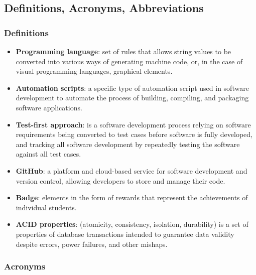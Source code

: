 \newpage

\subsection{Definitions, Acronyms, Abbreviations}

\subsubsection{Definitions}

\begin{itemize}
    \item \textbf{Programming language}: set of rules that allows string values to be converted into various ways of generating machine code, or, in the case of visual programming languages, graphical elements.
    \item \textbf{Automation scripts}: a specific type of automation script used in software development to automate the process of building, compiling, and packaging software applications.
    \item \textbf{Test-first approach}: is a software development process relying on software requirements being converted to test cases before software is fully developed, and tracking all software development by repeatedly testing the software against all test cases.
    \item \textbf{GitHub}: a platform and cloud-based service for software development and version control, allowing developers to store and manage their code.
    \item \textbf{Badge}: elements in the form of rewards that represent the achievements of individual students.
    \item \textbf{ACID properties}: (atomicity, consistency, isolation, durability) is a set of properties of database transactions intended to guarantee data validity despite errors, power failures, and other mishaps.
\end{itemize}

\vspace{12pt}

\subsubsection{Acronyms}

